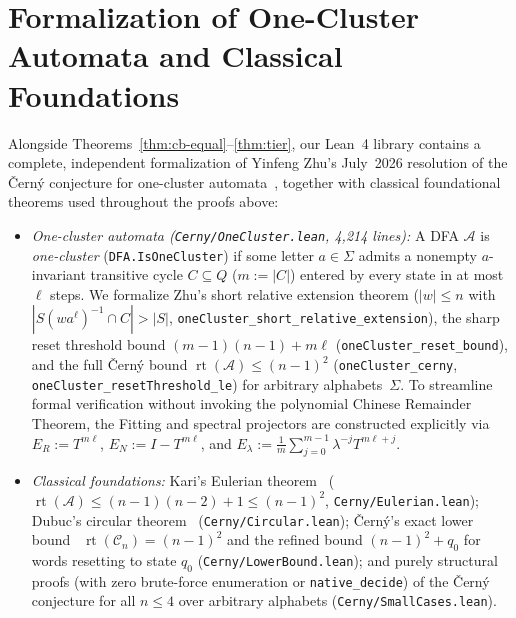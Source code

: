 \documentclass[11pt,a4paper]{article}
\theoremstyle{definition}
\theoremstyle{remark}
\newcommand{\rt}{\operatorname{rt}}
\newcommand{\cA}{\mathcal{A}}
\newcommand{\cC}{\mathcal{C}}
\newcommand{\us}{\_\allowbreak}
\begin{document}
\section{Formalization of One-Cluster Automata and Classical Foundations}
\label{sec:onecluster}

Alongside Theorems~\ref{thm:cb-equal}--\ref{thm:tier}, our Lean~4 library contains a complete, independent formalization of Yinfeng Zhu's July~2026 resolution of the \v{C}ern\'y conjecture for one-cluster automata~\cite{Zhu2026}, together with classical foundational theorems used throughout the proofs above:
\begin{itemize}[nosep]
  \item \emph{One-cluster automata (\texttt{Cerny/OneCluster.lean}, 4{,}214 lines):} A DFA $\cA$ is \emph{one-cluster} (\texttt{DFA.IsOneCluster}) if some letter $a \in \Sigma$ admits a nonempty $a$-invariant transitive cycle $C \subseteq Q$ ($m := |C|$) entered by every state in at most $\ell$ steps. We formalize Zhu's short relative extension theorem ($|w| \le n$ with $|S(w a^\ell)^{-1} \cap C| > |S|$, \texttt{oneCluster\us short\us relative\us extension}), the sharp reset threshold bound $(m - 1)(n - 1) + m\ell$ (\texttt{oneCluster\us reset\us bound}), and the full \v{C}ern\'y bound $\rt(\cA) \le (n - 1)^2$ (\texttt{oneCluster\us cerny}, \texttt{oneCluster\us resetThreshold\us le}) for arbitrary alphabets~$\Sigma$. To streamline formal verification without invoking the polynomial Chinese Remainder Theorem, the Fitting and spectral projectors are constructed explicitly via $E_R := T^{m\ell}$, $E_N := I - T^{m\ell}$, and $E_\lambda := \frac{1}{m}\sum_{j=0}^{m-1} \lambda^{-j} T^{m\ell + j}$.
  \item \emph{Classical foundations:} Kari's Eulerian theorem~\cite{Kari2003} ($\rt(\cA) \le (n-1)(n-2)+1 \le (n-1)^2$, \texttt{Cerny/Eulerian.lean}); Dubuc's circular theorem~\cite{Dubuc1998} (\texttt{Cerny/Circular.lean}); \v{C}ern\'y's exact lower bound~\cite{Cerny1964} $\rt(\cC_n) = (n-1)^2$ and the refined bound $(n-1)^2 + q_0$ for words resetting to state $q_0$ (\texttt{Cerny/LowerBound.lean}); and purely structural proofs (with zero brute-force enumeration or \texttt{native\us decide}) of the \v{C}ern\'y conjecture for all $n \le 4$ over arbitrary alphabets (\texttt{Cerny/SmallCases.lean}).
\end{itemize}

\end{document}
